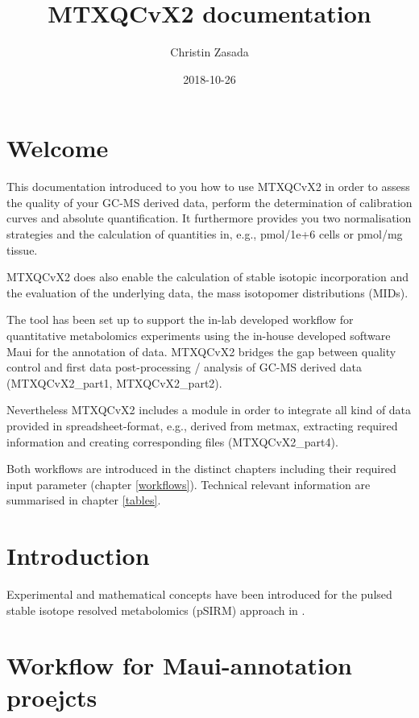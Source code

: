 \documentclass[]{book}
\title{MTXQCvX2 documentation}
\author{Christin Zasada}
\date{2018-10-26}
\theoremstyle{definition}
\theoremstyle{definition}
\theoremstyle{definition}
\theoremstyle{remark}
\begin{document}
\maketitle

{
\setcounter{tocdepth}{1}
\tableofcontents
}
\chapter{Welcome}\label{welcome}

This documentation introduced to you how to use MTXQCvX2 in order to
assess the quality of your GC-MS derived data, perform the determination
of calibration curves and absolute quantification. It furthermore
provides you two normalisation strategies and the calculation of
quantities in, e.g., pmol/1e+6 cells or pmol/mg tissue.

MTXQCvX2 does also enable the calculation of stable isotopic
incorporation and the evaluation of the underlying data, the mass
isotopomer distributions (MIDs).

The tool has been set up to support the in-lab developed workflow for
quantitative metabolomics experiments using the in-house developed
software Maui for the annotation of data. MTXQCvX2 bridges the gap
between quality control and first data post-processing / analysis of
GC-MS derived data (MTXQCvX2\_part1, MTXQCvX2\_part2).

Nevertheless MTXQCvX2 includes a module in order to integrate all kind
of data provided in spreadsheet-format, e.g., derived from metmax,
extracting required information and creating corresponding files
(MTXQCvX2\_part4).

Both workflows are introduced in the distinct chapters including their
required input parameter (chapter \ref{workflows}). Technical relevant
information are summarised in chapter \ref{tables}.

\chapter{Introduction}\label{intro}

Experimental and mathematical concepts have been introduced for the
pulsed stable isotope resolved metabolomics (pSIRM) approach in
\citep{Pietzke2014}.

\chapter{Workflow for Maui-annotation proejcts}\label{maui}
\end{document}
